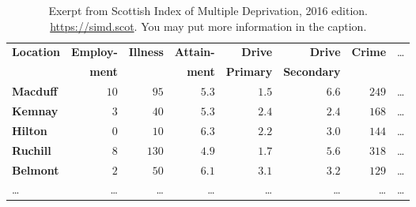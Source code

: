 \documentclass[11pt,a4paper]{article}
\begin{document}
\begin{table}[b]
  \caption{Exerpt from Scottish Index of Multiple Deprivation, 2016 edition.
    \url{https://simd.scot}. You may put more information in the caption.}
  \label{tab:example1}
\begin{tabular}{lrrrrrrr}
\hline\hline
\textbf{Location}&\textbf{Employ-}&\textbf{Illness}&\textbf{Attain-}&\textbf{Drive}  &\textbf{Drive}    &\textbf{Crime}&\dots\\
                 &\textbf{ment}   &                &\textbf{ment}   &\textbf{Primary}&\textbf{Secondary}&              &\\
\hline
\textbf{Macduff}&$10$&$ 95$&$5.3$&$1.5$&$6.6$&$249$&\dots\tabularnewline
\textbf{Kemnay}&$ 3$&$ 40$&$5.3$&$2.4$&$2.4$&$168$&\dots\tabularnewline
\textbf{Hilton}&$ 0$&$ 10$&$6.3$&$2.2$&$3.0$&$144$&\dots\tabularnewline
\textbf{Ruchill}&$ 8$&$130$&$4.9$&$1.7$&$5.6$&$318$&\dots\tabularnewline
\textbf{Belmont}&$ 2$&$ 50$&$6.1$&$3.1$&$3.2$&$129$&\dots\tabularnewline
\dots&\dots&\dots&\dots&\dots&\dots&\dots&\dots\tabularnewline
\hline
\end{tabular}
\end{table}


\end{document}
